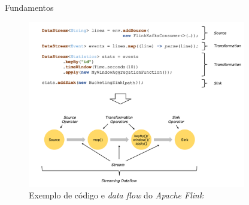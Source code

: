 \documentclass[aspectratio=43,10pt]{beamer}
\begin{document}
\begin{frame}[fragile]{Fundamentos}
\begin{figure}[ht]
\centering
\includegraphics[width=0.85\textwidth]{figuras/dataflow-code-flink.png}
\caption{Exemplo de código e \emph{data flow} do \emph{Apache Flink} \cite{ApacheFlink2020}}
\label{fig:dataflow-flink}
\end{figure}
\end{frame}

\newcommand{\novelty}{\emph{Novelty Detection}\xspace}
\newcommand{\nd}{ND\xspace}
\newcommand{\drift}{\emph{Concept Drift}\xspace}
\newcommand{\evolution}{\emph{Concept Evolution}\xspace}
\end{document}
